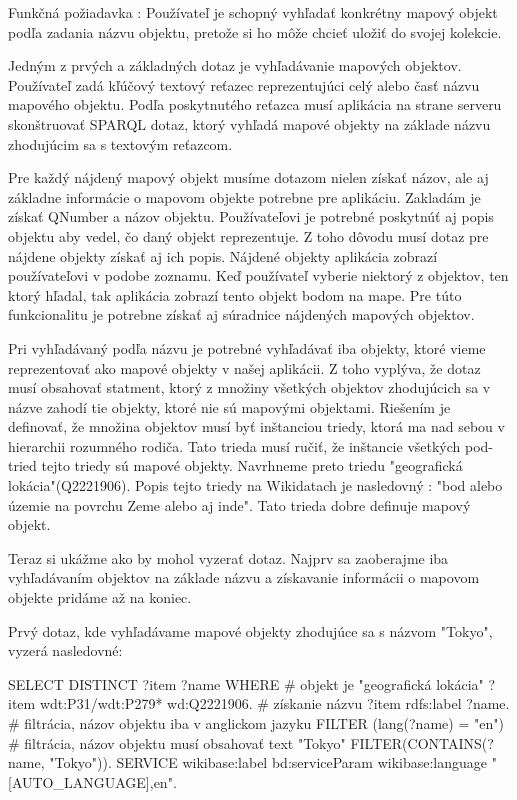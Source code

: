 Funkčná požiadavka : Používateľ je schopný vyhľadať konkrétny mapový objekt podľa zadania názvu objektu,
pretože si ho môže chcieť uložiť do svojej kolekcie.

Jedným z prvých a základných dotaz je vyhľadávanie mapových objektov.
Používateľ zadá kľúčový textový reťazec reprezentujúci celý alebo časť názvu mapového objektu.
Podľa poskytnutého reťazca musí aplikácia na strane serveru skonštruovať
SPARQL dotaz, ktorý vyhľadá mapové objekty na základe názvu zhodujúcim sa s textovým reťazcom.

Pre každý nájdený mapový objekt musíme dotazom nielen získať názov, ale aj základne informácie o mapovom objekte potrebne pre aplikáciu.
Zakladám je získať QNumber a názov objektu. Používateľovi je potrebné poskytnúť aj popis objektu aby vedel, čo daný objekt reprezentuje. Z toho
dôvodu musí dotaz pre nájdene objekty získať aj ich popis. Nájdené objekty aplikácia zobrazí používateľovi v podobe zoznamu. Keď používateľ
vyberie niektorý z objektov, ten ktorý hľadal, tak aplikácia zobrazí tento objekt bodom na mape. Pre túto funkcionalitu je potrebne získať
aj súradnice nájdených mapových objektov.

Pri vyhľadávaný podľa názvu je potrebné vyhľadávať iba objekty, ktoré vieme reprezentovať ako mapové objekty v našej aplikácii. Z toho vyplýva, že dotaz musí obsahovať statment, ktorý
z množiny všetkých objektov zhodujúcich sa v názve zahodí tie objekty, ktoré nie sú mapovými objektami.
Riešením je definovať, že množina objektov musí byť inštanciou triedy, ktorá ma nad sebou v hierarchii rozumného rodiča. Tato trieda musí ručiť, že  inštancie všetkých pod-tried tejto triedy sú mapové objekty.
Navrhneme preto triedu "geografická lokácia"(Q2221906). Popis tejto triedy na Wikidatach je nasledovný :
"bod alebo územie na povrchu Zeme alebo aj inde". Tato trieda dobre definuje mapový objekt.

Teraz si ukážme ako by mohol vyzerať dotaz. Najprv sa zaoberajme iba vyhľadávaním objektov na základe názvu a získavanie informácii
o mapovom objekte pridáme až na koniec.

Prvý dotaz, kde vyhľadávame mapové objekty zhodujúce sa s názvom "Tokyo", vyzerá nasledovné:
\begin{code}
      SELECT DISTINCT ?item ?name
      WHERE
      {
      # objekt je "geografická lokácia"
      ?item wdt:P31/wdt:P279* wd:Q2221906.
      # získanie názvu
      ?item rdfs:label ?name.
      # filtrácia, názov objektu iba v anglickom jazyku
      FILTER (lang(?name) = "en")
      # filtrácia, názov objektu musí obsahovať text "Tokyo"
      FILTER(CONTAINS(?name, "Tokyo")).
      SERVICE wikibase:label {
      bd:serviceParam wikibase:language "[AUTO_LANGUAGE],en".
      }
      }
\end{code}

